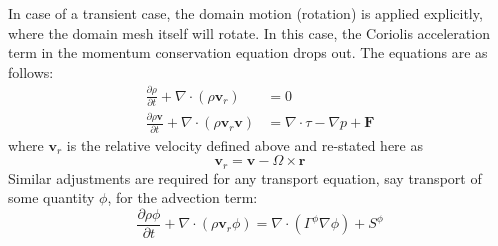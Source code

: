 \documentclass[12pt]{extarticle}
\newcommand{\<}{\langle}
\renewcommand{\>}{\rangle}
\theoremstyle{definition}
\begin{document}
In case of a transient case, the domain motion (rotation) is applied explicitly, where the domain mesh itself will rotate. In this case, the Coriolis acceleration term in the momentum conservation equation drops out. The equations are as follows:
\begin{align}
\frac{\partial \rho}{\partial t} + \nabla \cdot (\rho \textbf{v}_{r}) &= 0 \label{eq:cont_full_mot} \\
\frac{\partial \rho \textbf{v}}{\partial t} + \nabla \cdot (\rho \textbf{v}_{r} \textbf{v}) &= \nabla \cdot \tau - \nabla p + \textbf{F}\label{eq:mom_full_mot}
\end{align}
where $\textbf{v}_r$ is the relative velocity defined above and re-stated here as
\begin{equation}
    \textbf{v}_r = \textbf{v} - \Omega \times \textbf{r}
\end{equation}
Similar adjustments are required for any transport equation, say transport of some quantity $\phi$, for the advection term:
\begin{equation}
    \frac{\partial \rho \phi}{\partial t} + \nabla \cdot (\rho \textbf{v}_{r} \phi) = \nabla \cdot \left(\Gamma^{\phi} \nabla \phi \right) + S^{\phi}\label{eq:sca_eq_mot}
\end{equation}
\end{document}
